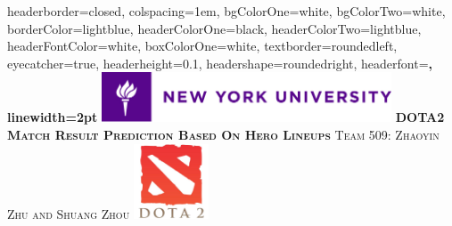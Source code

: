 \documentclass[landscape,a0paper,fontscale=0.285]{baposter} %
\begin{document}
\begin{poster}
{
headerborder=closed, %
colspacing=1em, %
bgColorOne=white, %
bgColorTwo=white, %
borderColor=lightblue, %
headerColorOne=black, %
headerColorTwo=lightblue, %
headerFontColor=white, %
boxColorOne=white, %
textborder=roundedleft, %
eyecatcher=true, %
headerheight=0.1\textheight, %
headershape=roundedright, %
headerfont=\Large\bf\textsc, %
linewidth=2pt %
}
%
{\includegraphics[height=4em]{nyu_long_logo.jpg}} %
{\bf\textsc{DOTA2 Match Result Prediction Based On Hero Lineups}\vspace{0.5em}} %
{\textsc{Team 509:\hspace{6pt} Zhaoyin Zhu and Shuang Zhou  }} %
{\includegraphics[height=6em]{dota2_logo.jpg}} %



\end{poster}
\end{document}
